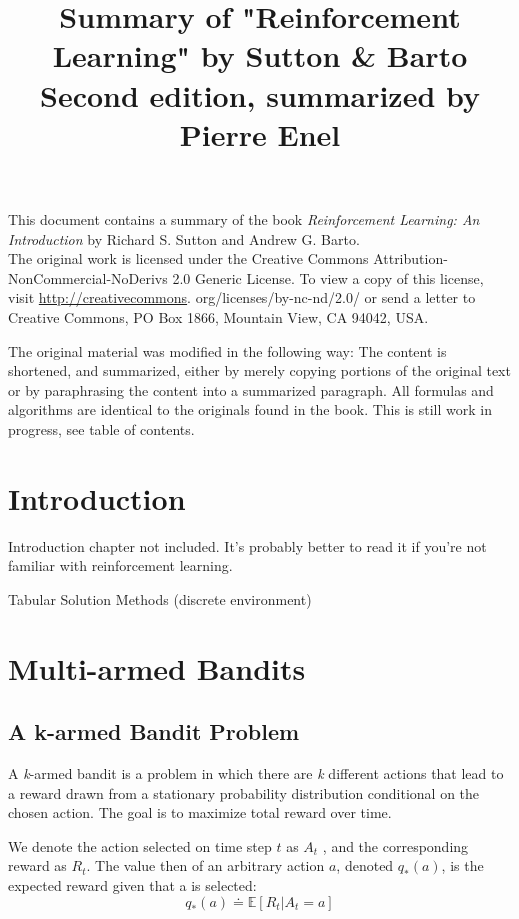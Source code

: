 \documentclass[11pt]{article}
\date{}
\title{Summary of "Reinforcement Learning" by Sutton \& Barto\\\medskip
\large Second edition, summarized by Pierre Enel}
\begin{document}
\maketitle
This document contains a summary of the book \emph{Reinforcement Learning: An
Introduction} by Richard S. Sutton and Andrew G. Barto.\\

The original work is licensed under the Creative Commons
Attribution-NonCommercial-NoDerivs 2.0 Generic License. To view a copy of this
license, visit \url{http://creativecommons}. org/licenses/by-nc-nd/2.0/ or send a
letter to Creative Commons, PO Box 1866, Mountain View, CA 94042, USA.

The original material was modified in the following way: The content is
shortened, and summarized, either by merely copying portions of the original text
or by paraphrasing the content into a summarized paragraph. All formulas and
algorithms are identical to the originals found in the book. This is still work
in progress, see table of contents.

\clearpage \tableofcontents \clearpage

\section{Introduction}
\label{sec:org24f3840}
Introduction chapter not included. It's probably better to read it if you're not
familiar with reinforcement learning.

Tabular Solution Methods (discrete environment)

\section{Multi-armed Bandits}
\label{sec:org7d9ab50}
\subsection{A k-armed Bandit Problem}
\label{sec:org4ea2f30}

A \emph{k}-armed bandit is a problem in which there are \emph{k} different actions that
lead to a reward drawn from a stationary probability distribution conditional on
the chosen action. The goal is to maximize total reward over time.

We denote the action selected on time step \(t\) as \(A_{t}\) , and the
corresponding reward as \(R_{t}\). The value then of an arbitrary action \(a\),
denoted \(q_{*}(a)\), is the expected reward given that a is selected:
\begin{equation}
q_{*}(a) \doteq \mathbb{E}[R_{t}|A_{t}=a]
\end{equation}
\end{document}

